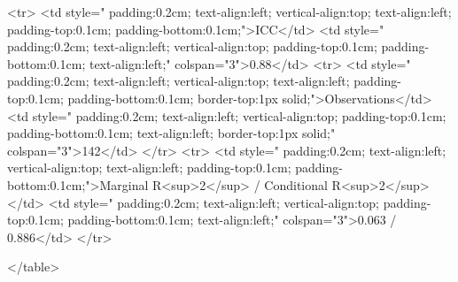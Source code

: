 <tr>
<td style=" padding:0.2cm; text-align:left; vertical-align:top; text-align:left; padding-top:0.1cm; padding-bottom:0.1cm;">ICC</td>
<td style=" padding:0.2cm; text-align:left; vertical-align:top; padding-top:0.1cm; padding-bottom:0.1cm; text-align:left;" colspan="3">0.88</td>
<tr>
<td style=" padding:0.2cm; text-align:left; vertical-align:top; text-align:left; padding-top:0.1cm; padding-bottom:0.1cm; border-top:1px solid;">Observations</td>
<td style=" padding:0.2cm; text-align:left; vertical-align:top; padding-top:0.1cm; padding-bottom:0.1cm; text-align:left; border-top:1px solid;" colspan="3">142</td>
</tr>
<tr>
<td style=" padding:0.2cm; text-align:left; vertical-align:top; text-align:left; padding-top:0.1cm; padding-bottom:0.1cm;">Marginal R<sup>2</sup> / Conditional R<sup>2</sup></td>
<td style=" padding:0.2cm; text-align:left; vertical-align:top; padding-top:0.1cm; padding-bottom:0.1cm; text-align:left;" colspan="3">0.063 / 0.886</td>
</tr>

</table>

